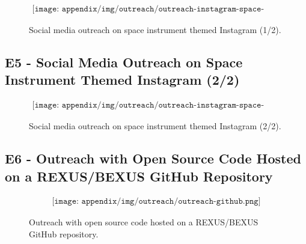 \begin{figure}[H]
    \begin{align*}
        \texttt{[image: appendix/img/outreach/outreach-instagram-space-instruments-1.png]}
    \end{align*}
    \caption{Social media outreach on space instrument themed Instagram (1/2).}
    \label{fig:outreach-instagram-si-1}
\end{figure}

\subsection*{E5 - Social Media Outreach on Space Instrument Themed Instagram (2/2)}

\begin{figure}[H]
    \begin{align*}
        \texttt{[image: appendix/img/outreach/outreach-instagram-space-instruments-2.png]}
    \end{align*}
    \caption{Social media outreach on space instrument themed Instagram (2/2).}
    \label{fig:outreach-instagram-si-2}
\end{figure}


\subsection*{E6 - Outreach with Open Source Code Hosted on a REXUS/BEXUS GitHub Repository}

\begin{figure}[H]
    \begin{align*}
        \texttt{[image: appendix/img/outreach/outreach-github.png]}
    \end{align*}
    \caption{Outreach with open source code hosted on a REXUS/BEXUS GitHub repository.}
    \label{fig:outreach-github}
\end{figure}

